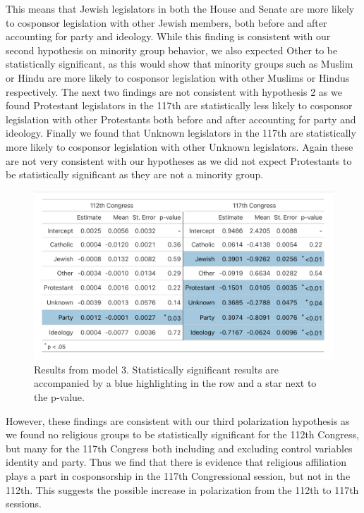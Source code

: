 \documentclass[Royal,times,sageh]{sagej}
\begin{document}
This means that Jewish legislators in both the House and Senate are more
likely to cosponsor legislation with other Jewish members, both before
and after accounting for party and ideology. While this finding is
consistent with our second hypothesis on minority group behavior, we
also expected Other to be statistically significant, as this would show
that minority groups such as Muslim or Hindu are more likely to
cosponsor legislation with other Muslims or Hindus respectively. The
next two findings are not consistent with hypothesis 2 as we found
Protestant legislators in the 117th are statistically less likely to
cosponsor legislation with other Protestants both before and after
accounting for party and ideology. Finally we found that Unknown
legislators in the 117th are statistically more likely to cosponsor
legislation with other Unknown legislators. Again these are not very
consistent with our hypotheses as we did not expect Protestants to be
statistically significant as they are not a minority group.

\begin{figure}

{\centering \includegraphics[width=0.85\linewidth]{images/final_model3} 

}

\caption{Results from model 3. Statistically significant results are accompanied by a blue highlighting in the row and a star next to the p-value. \label{fig:figure6}}\label{fig:unnamed-chunk-6}
\end{figure}

However, these findings are consistent with our third polarization
hypothesis as we found no religious groups to be statistically
significant for the 112th Congress, but many for the 117th Congress both
including and excluding control variables identity and party. Thus we
find that there is evidence that religious affiliation plays a part in
cosponsorship in the 117th Congressional session, but not in the 112th.
This suggests the possible increase in polarization from the 112th to
117th sessions.
\end{document}
